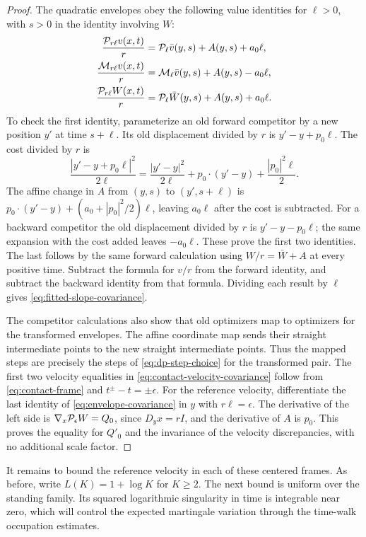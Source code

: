 \begin{proof}
The quadratic envelopes obey the following value identities for $\ell>0$,
with $s>0$ in the identity involving $W$:
\begin{equation}\label{eq:envelope-covariance}
\begin{split}
  \frac{\mathcal{P}_{r\ell}v(x,t)}{r}
    &=\mathcal{P}_\ell\bar v(y,s)+A(y,s)+a_0\ell,\\
  \frac{\mathcal{M}_{r\ell}v(x,t)}{r}
    &=\mathcal{M}_\ell\bar v(y,s)+A(y,s)-a_0\ell,\\
  \frac{\mathcal{P}_{r\ell}W(x,t)}{r}
    &=\mathcal{P}_\ell\bar W(y,s)+A(y,s)+a_0\ell.
\end{split}
\end{equation}
To check the first identity, parameterize an old forward competitor by a
new position $y'$ at time $s+\ell$.  Its old displacement divided by $r$
is $y'-y+p_0\ell$.  The cost divided by $r$ is
\[
  \frac{|y'-y+p_0\ell|^2}{2\ell}
    =\frac{|y'-y|^2}{2\ell}+p_0\cdot(y'-y)
                                     +\frac{|p_0|^2\ell}{2}.
\]
The affine change in $A$ from $(y,s)$ to $(y',s+\ell)$ is
$p_0\cdot(y'-y)+(a_0+|p_0|^2/2)\ell$, leaving $a_0\ell$ after the cost is
subtracted.  For a backward competitor the old displacement divided by $r$
is $y'-y-p_0\ell$; the same expansion with the cost added leaves
$-a_0\ell$.  These prove the first two identities.  The last follows by the
same forward calculation using $W/r=\bar W+A$ at every positive time.
Subtract the formula for $v/r$ from the forward identity, and subtract the
backward identity from that formula.  Dividing each result by $\ell$ gives
\eqref{eq:fitted-slope-covariance}.

The competitor calculations also show that old optimizers map to optimizers
for the transformed envelopes.  The affine coordinate map sends their
straight intermediate points to the new straight intermediate points.
Thus the mapped steps are precisely the steps of
\eqref{eq:dp-step-choice} for the transformed pair.  The first two velocity
equalities in \eqref{eq:contact-velocity-covariance} follow from
\eqref{eq:contact-frame} and $t^\pm-t=\pm\epsilon$.  For the reference
velocity, differentiate the last identity of \eqref{eq:envelope-covariance}
in $y$ with $r\ell=\epsilon$.  The derivative of the left side is
$\nabla_x\mathcal{P}_\epsilon W=Q_0$, since $D_yx=rI$, and the derivative of $A$
is $p_0$.  This proves the equality for $Q'_0$ and the invariance of the
velocity discrepancies, with no additional scale factor.
\end{proof}

It remains to bound the reference velocity in each of these centered
frames.  As before, write $L(K)=1+\log K$ for $K\ge2$.  The next bound is
uniform over the standing family.  Its squared logarithmic singularity in
time is integrable near zero, which will control the expected martingale
variation through the time-walk occupation estimates.

